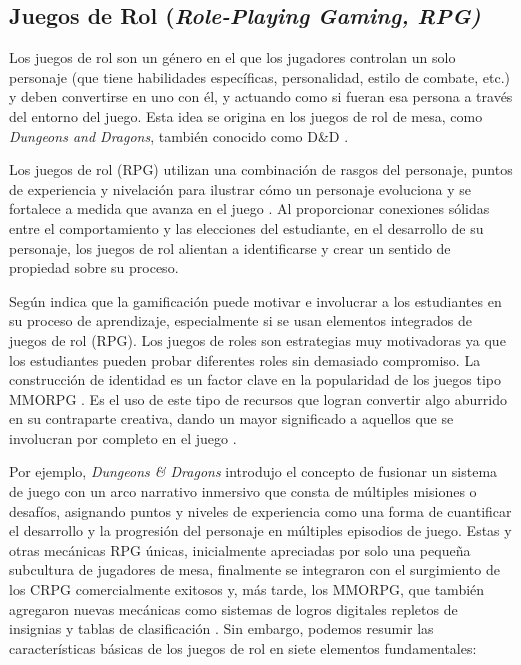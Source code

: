 \subsection{Juegos de Rol (\textit{Role-Playing Gaming, RPG)}}

Los juegos de rol son un género en el que los jugadores controlan un solo personaje (que tiene habilidades 
específicas, personalidad, estilo de combate, etc.) y deben convertirse en uno con él, y actuando como si 
fueran esa persona a través del entorno del juego. Esta idea se origina en los juegos de rol de mesa, como 
\textit{Dungeons and Dragons}, también conocido como D\&D \cite{Ntokos2019, gygax1979dungeons}.

Los juegos de rol (RPG) utilizan una combinación de rasgos del personaje, puntos de experiencia y nivelación
para ilustrar cómo un personaje evoluciona y se fortalece a medida que avanza en el juego \cite{Li2020}. Al
proporcionar conexiones sólidas entre el comportamiento y las elecciones del estudiante, en el desarrollo de
su personaje, los juegos de rol alientan a identificarse y crear un sentido de propiedad sobre su proceso.

Según  indica que la gamificación puede motivar e involucrar a los estudiantes en su proceso de
aprendizaje, especialmente si se usan elementos integrados de juegos de rol (RPG). Los juegos de roles son
estrategias muy motivadoras ya que los estudiantes pueden probar diferentes roles sin demasiado compromiso. La
construcción de identidad es un factor clave en la popularidad de los juegos tipo MMORPG \cite{Danka2020}. Es
el uso de este tipo de recursos que logran convertir algo aburrido en su contraparte creativa, dando un mayor
significado a aquellos que se involucran por completo en el juego \cite{Ntokos2019}.

Por ejemplo, \textit{Dungeons \& Dragons} introdujo el concepto de fusionar un sistema de juego con un arco
narrativo inmersivo que consta de múltiples misiones o desafíos, asignando puntos y niveles de experiencia
como una forma de cuantificar el desarrollo y la progresión del personaje en múltiples episodios de juego. 
Estas y otras mecánicas RPG únicas, inicialmente apreciadas por solo una pequeña subcultura de jugadores de 
mesa, finalmente se integraron con el surgimiento de los CRPG comercialmente exitosos y, más tarde, los 
MMORPG, que también agregaron nuevas mecánicas como sistemas de logros digitales repletos de insignias y 
tablas de clasificación \cite{byers2016the, gygax1979dungeons}. Sin embargo, podemos resumir las 
características básicas de los juegos de rol en siete elementos fundamentales:

